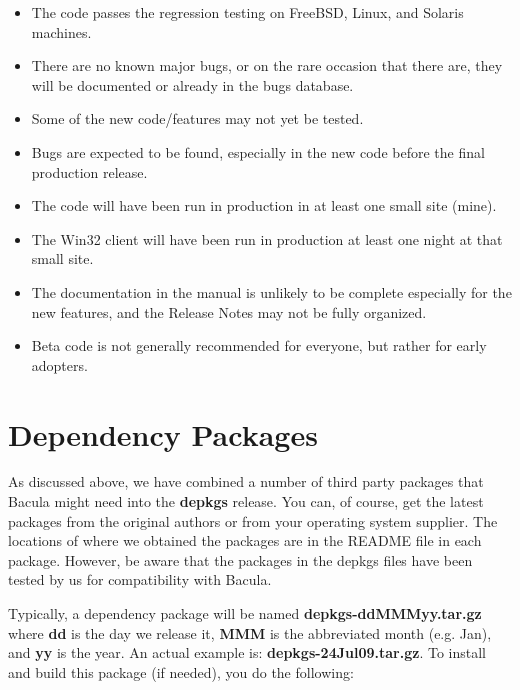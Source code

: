 \begin{itemize}
\item The code passes the regression testing on FreeBSD, Linux, and Solaris
  machines.

\item There are no known major bugs, or on the rare occasion that 
  there are, they will be documented or already in the bugs database.

\item Some of the new code/features may not yet be tested.

\item Bugs are expected to be found, especially in the new
  code before the final production release.

\item The code will have been run in production in at least one small
  site (mine).

\item The Win32 client will have been run in production at least
  one night at that small site.

\item The documentation in the manual is unlikely to be complete especially
  for the new features, and the Release Notes may not be fully
  organized.

\item Beta code is not generally recommended for everyone, but
  rather for early adopters.
\end{itemize}


\label{Dependency}
\section{Dependency Packages}

As discussed above, we have combined a number of third party packages that
Bacula might need into the {\bf depkgs} release. You can,
of course, get the latest packages from the original authors or 
from your operating system supplier. The locations of
where we obtained the packages are in the README file in each package.
However, be aware that the packages in the depkgs files have been tested by us
for compatibility with Bacula. 

Typically, a dependency package will be named {\bf depkgs-ddMMMyy.tar.gz}
where {\bf dd} is the day we release it, {\bf MMM}
is the abbreviated month (e.g. Jan), and {\bf yy} is the year. An actual
example is: {\bf depkgs-24Jul09.tar.gz}. To install and build this package (if
needed), you do the following: 

